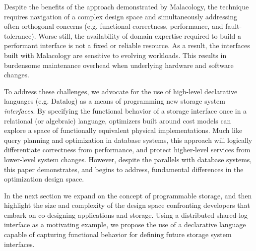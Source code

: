Despite the benefits of the approach demonstrated by Malacology, the technique
requires navigation of
a complex design space and simultaneously addressing often orthogonal
concerns (e.g. functional correctness, performance, and fault-tolerance).
Worse still, the availability of domain expertise required to build a performant interface is not a fixed or reliable resource. 
As a result, the interfaces built with Malacology are sensitive to evolving
workloads. This results in burdensome maintenance overhead when underlying
hardware and software changes.

To address these challenges, we advocate for the use of high-level declarative
languages (e.g. Datalog) as a means of programming new storage system
\emph{interfaces}.  By specifying the functional behavior of a storage interface once
in a relational (or algebraic) language, optimizers built around cost models
can explore a space of
functionally equivalent physical implementations. Much like query planning and
optimization in database systems, this approach will logically differentiate
correctness from performance, and protect higher-level services from lower-level
system changes. However, despite the parallels with database systems, this
paper demonstrates, and begins to address, fundamental differences in the
optimization design space.

In the next section we expand on the concept of programmable storage, and then
highlight the size and complexity of the design space confronting developers
that embark on co-designing applications and storage.  Using a distributed
shared-log interface as a motivating example, we propose the use of a
declarative language capable of capturing functional behavior for defining
future storage system interfaces.
